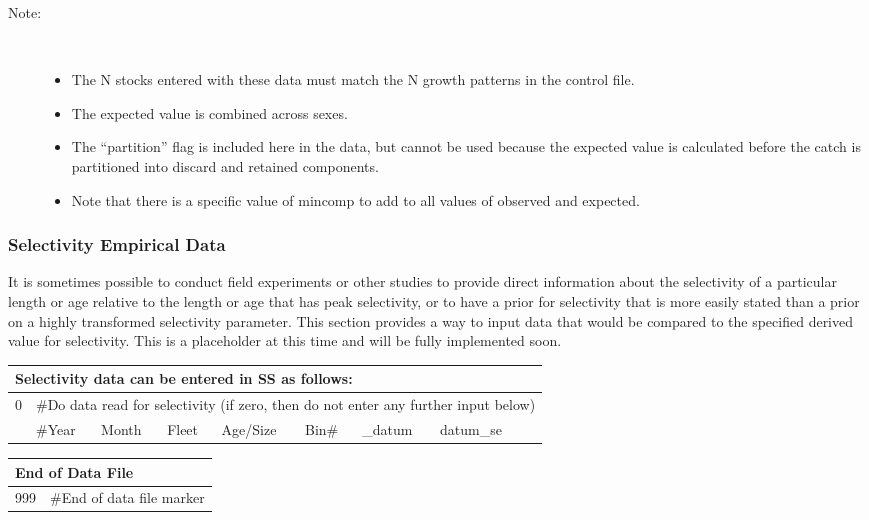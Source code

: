 \begin{description}
	\item[Note:]\
	\begin{itemize}
		\item The N stocks entered with these data must match the N growth patterns in the control file.
		\item The expected value is combined across sexes.
		\item The “partition” flag is included here in the data, but cannot be used because the expected value is calculated before the catch is partitioned into discard and retained components.
		\item Note that there is a specific value of mincomp to add to all values of observed and expected.
	\end{itemize}
\end{description}

\subsubsection{Selectivity Empirical Data}
It is sometimes possible to conduct field experiments or other studies to provide direct information about the selectivity of a particular length or age relative to the length or age that has peak selectivity, or to have a prior for selectivity that is more easily stated than a prior on a highly transformed selectivity parameter.  This section provides a way to input data that would be compared to the specified derived value for selectivity.  This is a placeholder at this time and will be fully implemented soon.

\begin{center}
	\begin{tabular}{p{1.5cm} p{1.5cm} p{1.5cm} p{1.5cm} p{1.5cm} p{1.5cm} p{1.5cm} p{1.5cm} p{1.1cm}}
		\multicolumn{9}{l}{Selectivity data can be entered in SS as follows:}\\
		\hline
		0 &  \multicolumn{8}{l}{\#Do data read for selectivity (if zero, then do not enter any further input below)}\\
        \hline
		& \#Year & Month & Fleet & Age/Size & Bin\# & \_datum & datum\_se \\
		\hline
	\end{tabular}
\end{center}

\begin{center}
	\begin{tabular}{p{2cm} p{14cm}}\\
		\multicolumn{2}{l}{End of Data File}\\
		\hline
		999 & \#End of data file marker\\
		\hline
	\end{tabular}
\end{center}


